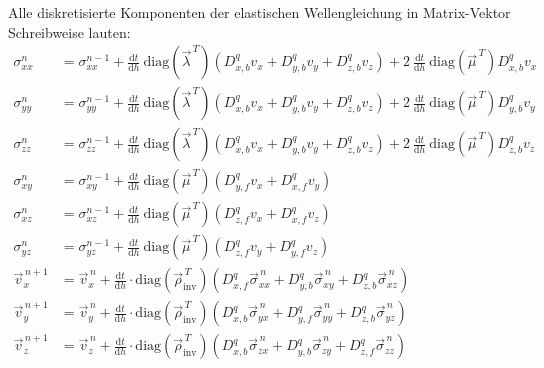 \documentclass[pdftex,a4paper,parskip,listof=totoc,bibliography=totoc,onehalfspacing,12pt]{scrreprt}
\begin{document}
Alle diskretisierte Komponenten der elastischen Wellengleichung in Matrix-Vektor Schreibweise lauten:
\begin{align*}
	\sigma_{xx}^{n} &= \sigma_{xx}^{n-1} + \frac{\mathrm{d}t}{\mathrm{d}h}~ \mathrm{diag} \left( \vec{\lambda}^{\,T} \right) \left( D_{x,b}^q v_x +D_{y,b}^q v_y + D_{z,b}^q v_z \right) + 2~ \frac{\mathrm{d}t}{\mathrm{d}h} ~\mathrm{diag} \left( \vec{\mu}^{\,T} \right) D_{x,b}^q v_x\\
	\sigma_{yy}^{n} &= \sigma_{yy}^{n-1} + \frac{\mathrm{d}t}{\mathrm{d}h}~ \mathrm{diag} \left( \vec{\lambda}^{\,T} \right) \left( D_{x,b}^q v_x +D_{y,b}^q v_y + D_{z,b}^q v_z \right) + 2~ \frac{\mathrm{d}t}{\mathrm{d}h} ~\mathrm{diag} \left( \vec{\mu}^{\,T} \right) D_{y,b}^q v_y\\
	\sigma_{zz}^{n} &= \sigma_{zz}^{n-1} + \frac{\mathrm{d}t}{\mathrm{d}h}~ \mathrm{diag} \left( \vec{\lambda}^{\,T} \right) \left( D_{x,b}^q v_x +D_{y,b}^q v_y + D_{z,b}^q v_z \right) + 2~ \frac{\mathrm{d}t}{\mathrm{d}h} ~\mathrm{diag} \left( \vec{\mu}^{\,T} \right) D_{z,b}^q v_z\\
	\sigma_{xy}^{n} &= \sigma_{xy}^{n-1} + \frac{\mathrm{d}t}{\mathrm{d}h}~ \mathrm{diag} \left( \vec{\mu}^{\,T} \right) \left( D_{y,f}^q v_x + D_{x,f}^q v_y \right)\\
	\sigma_{xz}^{n} &= \sigma_{xz}^{n-1} + \frac{\mathrm{d}t}{\mathrm{d}h}~ \mathrm{diag} \left( \vec{\mu}^{\,T} \right) \left( D_{z,f}^q v_x + D_{x,f}^q v_z \right)\\
	\sigma_{yz}^{n} &= \sigma_{yz}^{n-1} + \frac{\mathrm{d}t}{\mathrm{d}h}~ \mathrm{diag} \left( \vec{\mu}^{\,T} \right) \left( D_{z,f}^q v_y + D_{y,f}^q v_z \right)\\
	\vec{v}_x^{\,n+1} &= \vec{v}_x^{\,n} + \frac{\mathrm{d}t}{\mathrm{d}h} \cdot \mathrm{diag} \left( \vec{\rho}_\mathrm{inv}^{\,T} \right) \left( D_{x,f}^q \vec{\sigma}_{xx}^{\,n} + D_{y,b}^q \vec{\sigma}_{xy}^{\,n} + D_{z,b}^q \vec{\sigma}_{xz}^{\,n} \right)\\
	\vec{v}_y^{\,n+1} &= \vec{v}_y^{\,n} + \frac{\mathrm{d}t}{\mathrm{d}h} \cdot \mathrm{diag} \left( \vec{\rho}_\mathrm{inv}^{\,T} \right) \left( D_{x,b}^q \vec{\sigma}_{yx}^{\,n} + D_{y,f}^q \vec{\sigma}_{yy}^{\,n} + D_{z,b}^q \vec{\sigma}_{yz}^{\,n} \right)\\
	\vec{v}_z^{\,n+1} &= \vec{v}_z^{\,n} + \frac{\mathrm{d}t}{\mathrm{d}h} \cdot \mathrm{diag} \left( \vec{\rho}_\mathrm{inv}^{\,T} \right) \left( D_{x,b}^q \vec{\sigma}_{zx}^{\,n} + D_{y,b}^q \vec{\sigma}_{zy}^{\,n} + D_{z,f}^q \vec{\sigma}_{zz}^{\,n} \right)\\
\end{align*}























\end{document}
